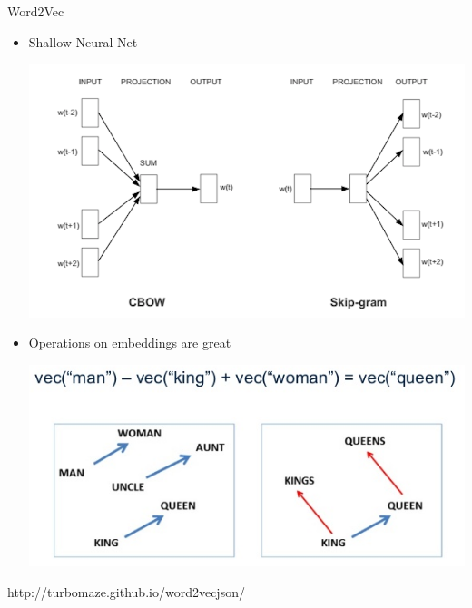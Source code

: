\documentclass{beamer}
\begin{document}
\begin{frame}{Word2Vec}
	\begin{itemize}
		\item Shallow Neural Net
				\begin{center}
					\includegraphics[scale=0.2]{img/w2vv}
				\end{center}
				
		\item Operations on embeddings are great
		\begin{center}
			\includegraphics[scale=0.5]{img/w2v}
		\end{center}
		
	\end{itemize}
	http://turbomaze.github.io/word2vecjson/
\end{frame}
\end{document}
